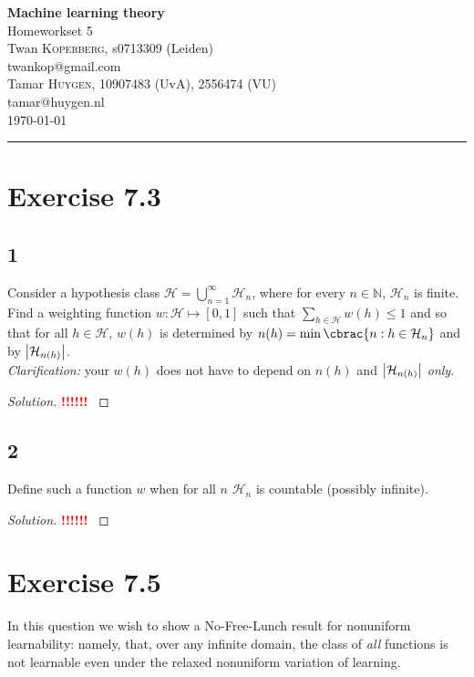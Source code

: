 \documentclass[10pt, a4paper, twoside]{amsart}
\makeatletter
\theoremstyle{plain}
\newcommand{\N}{\ensuremath{\mathbb{N}}}
\DeclarePairedDelimiter\abs{\lvert}{\rvert}
\DeclarePairedDelimiter\cbrac\{\}
\newcommand{\cH}{\ensuremath{\mathcal{H}}}
\newenvironment{solution}
               {\let\oldqedsymbol=\qedsymbol
                \renewcommand{\qedsymbol}{$\blacktriangleleft$}
                \begin{proof}[Solution]}
               {\end{proof}
                \renewcommand{\qedsymbol}{\oldqedsymbol}}
\newcommand{\TODO}{\textcolor{red}{\textbf{!!!!!! }}}
\newcommand{\firstName}  {Twan}
\newcommand{\lastName}   {Koperberg}
\newcommand{\studId}     {0713309 (Leiden)}
\renewcommand{\email}    {twankop@gmail.com}
\newcommand{\firstNameII}  {Tamar}
\newcommand{\lastNameII}   {Huygen}
\newcommand{\studIdII}     {10907483 (UvA)}
\newcommand{\studIdIII}    {2556474 (VU)}
\newcommand{\emailII}     {tamar@huygen.nl}
\makeatother
\begin{document}
\begin{center}

  {\huge\bf Machine learning theory}\\
  {\large\sc Homeworkset 5 }\\ \vspace{1em}
  \firstName \textsc{ \lastName}, {\sc s}\studId \\
  \email\text{}\\ \smallskip
  \firstNameII \textsc{ \lastNameII}, \studIdII, \studIdIII\\
  \emailII \\ \bigskip
  \today \\\bigskip
  \hrule
  \bigskip
\end{center}


 \section*{Exercise 7.3}
 \subsection*{1}
 Consider a hypothesis class $\cH = \bigcup_{n=1}^\infty \cH_n$, where for every $n \in \N$, $\cH_n$ is finite. Find a weighting function $w : \cH \mapsto [0,1]$ such that $\sum_{h \in \cH} w(h) \leq 1$ and so that for all $h \in \cH$, $w(h)$ is determined by $n(h) = \min \cbrac{n:h \in \cH_n}$ and by $\abs*{\cH_{n(h)}}$.\\
 \textit{Clarification:} your $w(h)$ does not have to depend on $n(h)$ and $\abs*{\cH_{n(h)}}$ \textit{only}.
\begin{solution}
\TODO
\end{solution}
\subsection*{2}
Define such a function $w$ when for all $n$ $\cH_n$ is countable (possibly infinite).
 \begin{solution}
\TODO
 \end{solution}
 
\section*{Exercise 7.5}
In this question we wish to show a No-Free-Lunch result for nonuniform learnability: namely, that, over any infinite domain, the class of \textit{all} functions is not learnable even under the relaxed nonuniform variation of learning.
\end{document}
